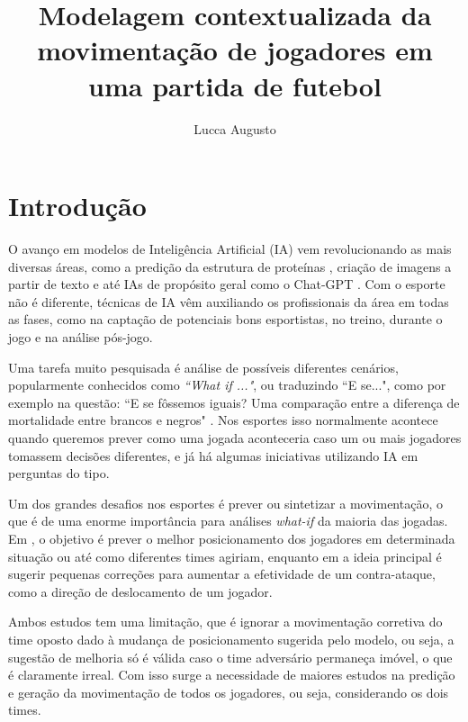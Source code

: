 \documentclass[12pt]{article}
\title{Modelagem contextualizada da movimentação de jogadores em uma partida de futebol}
\author{Lucca Augusto\inst{1}}
\begin{document}
\maketitle


\section{Introdução}\label{int}
O avanço em modelos de Inteligência Artificial (IA) vem revolucionando as mais diversas áreas, como a predição da estrutura de proteínas \cite{alphafold}, criação de imagens a partir de texto \cite{dalle} e até IAs de propósito geral como o Chat-GPT \cite{chatgpt}. Com o esporte não é diferente, técnicas de IA vêm auxiliando os profissionais da área em todas as fases, como na captação de potenciais bons esportistas, no treino, durante o jogo e na análise pós-jogo. 

Uma tarefa muito pesquisada é análise de possíveis diferentes cenários, popularmente conhecidos como \textit{``What if ..."}, ou traduzindo ``E se...", como por exemplo na questão: ``E se fôssemos iguais? Uma comparação entre a diferença de mortalidade entre brancos e negros" \cite{satcher2005if}. Nos esportes isso normalmente acontece quando queremos prever como uma jogada aconteceria caso um ou mais jogadores tomassem decisões diferentes, e já há algumas iniciativas utilizando IA em perguntas do tipo. 

Um dos grandes desafios nos esportes é prever ou sintetizar a movimentação, o que é de uma enorme importância para análises \textit{what-if} da maioria das jogadas. Em \cite{le2017data}, o objetivo é prever o melhor posicionamento dos jogadores em determinada situação ou até como diferentes times agiriam, enquanto em \cite{graphcounteratack} a ideia principal é sugerir pequenas correções para aumentar a efetividade de um contra-ataque, como a direção de deslocamento de um jogador. 

Ambos estudos tem uma limitação, que é ignorar a movimentação corretiva do time oposto dado à mudança de posicionamento sugerida pelo modelo, ou seja, a sugestão de melhoria só é válida caso o time adversário permaneça imóvel, o que é claramente irreal. Com isso surge a necessidade de maiores estudos na predição e geração da movimentação de todos os jogadores, ou seja, considerando os dois times. 
\end{document}
